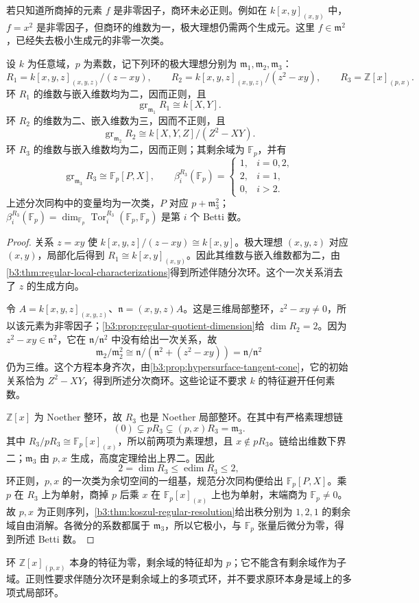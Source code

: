 若只知道所商掉的元素 \(f\) 是非零因子，商环未必正则。例如在 \(k[x,y]_{(x,y)}\) 中，\(f=x^2\) 是非零因子，但商环的维数为一，极大理想仍需两个生成元。这里 \(f\in\mathfrak m^2\)，已经失去极小生成元的非零一次类。

\begin{proposition}\label{b3:prop:regular-local-basic-examples}
	设 \(k\) 为任意域，\(p\) 为素数，记下列环的极大理想分别为 \(\mathfrak m_1,\mathfrak m_2,\mathfrak m_3\)：
	\[
		R_1=k[x,y,z]_{(x,y,z)}/(z-xy),\qquad R_2=k[x,y,z]_{(x,y,z)}/(z^2-xy),\qquad R_3=\mathbb Z[x]_{(p,x)}.
	\]
	环 \(R_1\) 的维数与嵌入维数均为二，因而正则，且
	\[
		\operatorname{gr}_{\mathfrak m_1}R_1\cong k[X,Y].
	\]
	环 \(R_2\) 的维数为二、嵌入维数为三，因而不正则，且
	\[
		\operatorname{gr}_{\mathfrak m_2}R_2\cong k[X,Y,Z]/(Z^2-XY).
	\]
	环 \(R_3\) 的维数与嵌入维数均为二，因而正则；其剩余域为 \(\mathbb F_p\)，并有
	\[
		\operatorname{gr}_{\mathfrak m_3}R_3\cong\mathbb F_p[P,X], \qquad \beta_i^{R_3}(\mathbb F_p)=
		\begin{cases}
			1,&i=0,2,\\
			2,&i=1,\\
			0,&i>2.
		\end{cases}
	\]
	上述分次同构中的变量均为一次类，\(P\) 对应 \(p+\mathfrak m_3^2\)；\(\beta_i^{R_3}(\mathbb F_p)=\dim_{\mathbb F_p}\operatorname{Tor}_i^{R_3}(\mathbb F_p,\mathbb F_p)\) 是第 \(i\) 个 Betti 数。
\end{proposition}
\begin{proof}
	关系 \(z=xy\) 使 \(k[x,y,z]/(z-xy)\cong k[x,y]\)。极大理想 \((x,y,z)\) 对应 \((x,y)\)，局部化后得到 \(R_1\cong k[x,y]_{(x,y)}\)。因此其维数与嵌入维数都为二，由\cref{b3:thm:regular-local-characterizations}得到所述伴随分次环。这个一次关系消去了 \(z\) 的生成方向。

	令 \(A=k[x,y,z]_{(x,y,z)}\)、\(\mathfrak n=(x,y,z)A\)。这是三维局部整环，\(z^2-xy\ne0\)，所以该元素为非零因子；\cref{b3:prop:regular-quotient-dimension}给 \(\dim R_2=2\)。因为 \(z^2-xy\in\mathfrak n^2\)，它在 \(\mathfrak n/\mathfrak n^2\) 中没有给出一次关系，故
	\[
		\mathfrak m_2/\mathfrak m_2^2 \cong\mathfrak n/(\mathfrak n^2+(z^2-xy)) =\mathfrak n/\mathfrak n^2
	\]
	仍为三维。这个方程本身齐次，由\cref{b3:prop:hypersurface-tangent-cone}，它的初始关系恰为 \(Z^2-XY\)，得到所述分次商环。这些论证不要求 \(k\) 的特征避开任何素数。

	\(\mathbb Z[x]\) 为 Noether 整环，故 \(R_3\) 也是 Noether 局部整环。在其中有严格素理想链
	\[
		(0)\subsetneq pR_3\subsetneq(p,x)R_3=\mathfrak m_3.
	\]
	其中 \(R_3/pR_3\cong\mathbb F_p[x]_{(x)}\)，所以前两项为素理想，且 \(x\notin pR_3\)。链给出维数下界二；\(\mathfrak m_3\) 由 \(p,x\) 生成，高度定理给出上界二。因此
	\[
		2=\dim R_3\le\operatorname{edim}R_3\le2,
	\]
	环正则，\(p,x\) 的一次类为余切空间的一组基，规范分次同构便给出 \(\mathbb F_p[P,X]\)。乘 \(p\) 在 \(R_3\) 上为单射，商掉 \(p\) 后乘 \(x\) 在 \(\mathbb F_p[x]_{(x)}\) 上也为单射，末端商为 \(\mathbb F_p\ne0\)。故 \(p,x\) 为正则序列，\cref{b3:thm:koszul-regular-resolution}给出秩分别为 \(1,2,1\) 的剩余域自由消解。各微分的系数都属于 \(\mathfrak m_3\)，所以它极小，与 \(\mathbb F_p\) 张量后微分为零，得到所述 Betti 数。
\end{proof}

环 \(\mathbb Z[x]_{(p,x)}\) 本身的特征为零，剩余域的特征却为 \(p\)；它不能含有剩余域作为子域。正则性要求伴随分次环是剩余域上的多项式环，并不要求原环本身是域上的多项式局部环。
